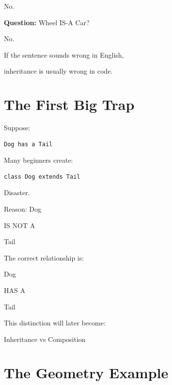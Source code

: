 \documentclass[11pt,a4paper]{book}
\begin{document}
            No.


\textbf{Question:}
Wheel IS-A Car?

            No.


\begin{rosettarule}

If the sentence sounds wrong in English,

inheritance is usually wrong in code.

\end{rosettarule}


\section{The First Big Trap}

Suppose:

\begin{verbatim}
Dog has a Tail
\end{verbatim}

Many beginners create:

\begin{verbatim}
class Dog extends Tail
\end{verbatim}

Disaster.


Reason:
    Dog

    IS NOT A

    Tail


The correct relationship is:


    Dog

    HAS A
    
    Tail



This distinction will later become:

    Inheritance vs Composition


\section{The Geometry Example}
\end{document}
